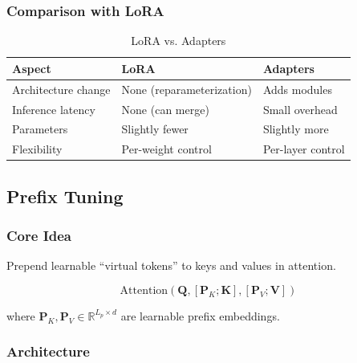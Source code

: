 \subsubsection{Comparison with LoRA}

\begin{table}[H]
\centering
\caption{LoRA vs. Adapters}
\begin{tabularx}{\textwidth}{lXX}
\toprule
\textbf{Aspect} & \textbf{LoRA} & \textbf{Adapters} \\
\midrule
Architecture change & None (reparameterization) & Adds modules \\
Inference latency & None (can merge) & Small overhead \\
Parameters & Slightly fewer & Slightly more \\
Flexibility & Per-weight control & Per-layer control \\
\bottomrule
\end{tabularx}
\end{table}

\subsection{Prefix Tuning}

\subsubsection{Core Idea}

Prepend learnable ``virtual tokens'' to keys and values in attention.

\begin{equation}
\text{Attention}(\mathbf{Q}, [\mathbf{P}_K; \mathbf{K}], [\mathbf{P}_V; \mathbf{V}])
\end{equation}

where $\mathbf{P}_K, \mathbf{P}_V \in \mathbb{R}^{L_p \times d}$ are learnable prefix embeddings.
\subsubsection{Architecture}

